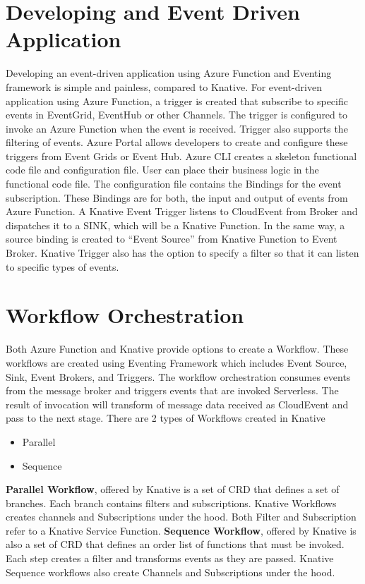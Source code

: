 \documentclass[12pt]{article}
\begin{document}
\begin{flushleft}
\section{Developing and Event Driven Application}
Developing an event-driven application using Azure Function and Eventing framework is simple and painless, compared to Knative.
\hfill \break
For event-driven application using Azure Function, a trigger is created that subscribe to specific events in EventGrid, EventHub or other Channels. The trigger is configured to invoke an Azure Function when the event is received. Trigger also supports the filtering of events. 
Azure Portal allows developers to create and configure these triggers from Event Grids or Event Hub.
Azure CLI creates a skeleton functional code file and configuration file. User can place their business logic in the functional code file. The configuration file contains the Bindings for the event subscription. These Bindings are for both, the input and output of events from Azure Function. 
\hfill \break
A Knative Event Trigger listens to CloudEvent from Broker and dispatches it to a SINK, which will be a Knative Function. In the same way, a source binding is created to “Event Source” from Knative Function to Event Broker. Knative Trigger also has the option to specify a filter so that it can listen to specific types of events.


\section{Workflow Orchestration }
Both Azure Function and Knative provide options to create a Workflow. These workflows are created using Eventing Framework which includes Event Source, Sink, Event Brokers, and Triggers. 
\hfill \break
The workflow orchestration consumes events from the message broker and triggers events that are invoked Serverless. The result of invocation will transform of message data received as CloudEvent and pass to the next stage. 
\hfill \break
There are 2 types of Workflows created in Knative 
\begin{itemize}
    \item Parallel
    \item Sequence
\end{itemize}
\textbf{Parallel Workflow}, offered by Knative is a set of CRD that defines a set of branches. Each branch contains filters and subscriptions. Knative Workflows creates channels and Subscriptions under the hood. Both Filter and Subscription refer to a Knative Service Function.
\hfill \break
\textbf{Sequence Workflow}, offered by Knative is also a set of CRD that defines an order list of functions that must be invoked. Each step creates a filter and transforms events as they are passed. Knative Sequence workflows also create Channels and Subscriptions under the hood.


\end{flushleft}
\end{document}
